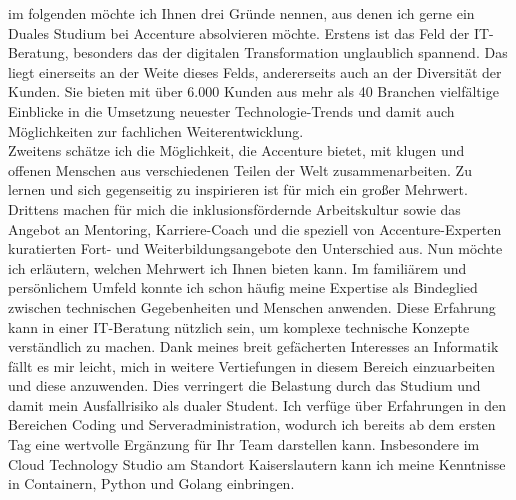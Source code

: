 \documentclass[11pt,a4paper,sans]{moderncv}        %
\begin{document}
im folgenden möchte ich Ihnen drei Gründe nennen, aus denen ich gerne ein Duales Studium bei Accenture absolvieren möchte.\newline
Erstens ist das Feld der IT-Beratung, besonders das der digitalen Transformation unglaublich spannend. Das liegt einerseits an der Weite dieses Felds, andererseits auch an der Diversität der Kunden. Sie bieten mit über 6.000 Kunden aus mehr als 40 Branchen vielfältige Einblicke in die Umsetzung neuester Technologie-Trends und damit auch Möglichkeiten zur fachlichen Weiterentwicklung.\\
Zweitens schätze ich die Möglichkeit, die Accenture bietet, mit klugen und offenen Menschen aus verschiedenen Teilen der Welt zusammenarbeiten. Zu lernen und sich gegenseitig zu inspirieren ist für mich ein großer Mehrwert.\newline
Drittens machen für mich die inklusionsfördernde Arbeitskultur sowie das Angebot an Mentoring, Karriere-Coach und die speziell von Accenture-Experten kuratierten Fort- und Weiterbildungsangebote den Unterschied aus.\newline
Nun möchte ich erläutern, welchen Mehrwert ich Ihnen bieten kann.\newline
Im familiärem und persönlichem Umfeld konnte ich schon häufig meine Expertise als Bindeglied zwischen technischen Gegebenheiten und Menschen anwenden. Diese Erfahrung kann in einer IT-Beratung nützlich sein, um komplexe technische Konzepte verständlich zu machen.\newline
Dank meines breit gefächerten Interesses an Informatik fällt es mir leicht, mich in weitere Vertiefungen in diesem Bereich einzuarbeiten und diese anzuwenden. Dies verringert die Belastung durch das Studium und damit mein Ausfallrisiko als dualer Student.\newline
Ich verfüge über Erfahrungen in den Bereichen Coding und Serveradministration, wodurch ich bereits ab dem ersten Tag eine wertvolle Ergänzung für Ihr Team darstellen kann. Insbesondere im Cloud Technology Studio am Standort Kaiserslautern kann ich meine Kenntnisse in Containern, Python und Golang einbringen.\newline

%




\makeletterclosing
\end{document}
